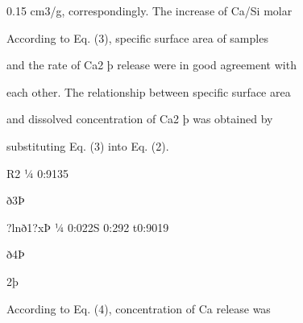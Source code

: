 \documentclass[a4paper,portrait,12pt]{article}
\begin{document}
\begin{flushleft}
0.15 cm3/g, correspondingly. The increase of Ca/Si molar
\end{flushleft}





\begin{flushleft}
According to Eq. (3), speciﬁc surface area of samples
\end{flushleft}


\begin{flushleft}
and the rate of Ca2 þ release were in good agreement with
\end{flushleft}


\begin{flushleft}
each other. The relationship between speciﬁc surface area
\end{flushleft}


\begin{flushleft}
and dissolved concentration of Ca2 þ was obtained by
\end{flushleft}


\begin{flushleft}
substituting Eq. (3) into Eq. (2).
\end{flushleft}





\begin{flushleft}
R2 ¼ 0:9135
\end{flushleft}





\begin{flushleft}
ð3Þ
\end{flushleft}





\begin{flushleft}
?lnð1?xÞ ¼ 0:022S 0:292 t0:9019
\end{flushleft}





\begin{flushleft}
ð4Þ
\end{flushleft}


\begin{flushleft}
2þ
\end{flushleft}





\begin{flushleft}
According to Eq. (4), concentration of Ca release was
\end{flushleft}
\end{document}
